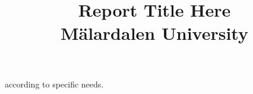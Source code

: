 \documentclass[conference, twocolumn]{IEEEtran} %
\title{Report Title Here\\
Mälardalen University}
\begin{document}
    \maketitle
    according to specific needs.
    
    
    
    
    
    
    
    
    
    
\end{document}
